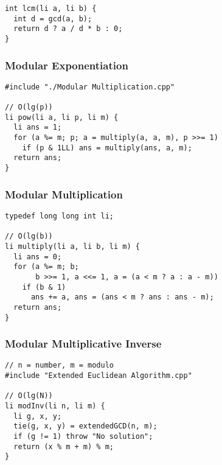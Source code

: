 \documentclass[twoside]{article}
\newcommand{\fileTitleStyle}{\large\underline}
\begin{document}
\begin{multicols*}{2}
\begin{verbatim}
int lcm(li a, li b) {
  int d = gcd(a, b);
  return d ? a / d * b : 0;
}
\end{verbatim}

\subsubsectionfont{\centering\bfseries\Large}
\subsubsectionfont{\fileTitleStyle}
\subsubsection*{Modular Exponentiation}
\begin{verbatim}
#include "./Modular Multiplication.cpp"

// O(lg(p))
li pow(li a, li p, li m) {
  li ans = 1;
  for (a %= m; p; a = multiply(a, a, m), p >>= 1)
    if (p & 1LL) ans = multiply(ans, a, m);
  return ans;
}
\end{verbatim}

\subsubsectionfont{\centering\bfseries\Large}
\subsubsectionfont{\fileTitleStyle}
\subsubsection*{Modular Multiplication}
\begin{verbatim}
typedef long long int li;

// O(lg(b))
li multiply(li a, li b, li m) {
  li ans = 0;
  for (a %= m; b;
       b >>= 1, a <<= 1, a = (a < m ? a : a - m))
    if (b & 1)
      ans += a, ans = (ans < m ? ans : ans - m);
  return ans;
}
\end{verbatim}

\subsubsectionfont{\centering\bfseries\Large}
\subsubsectionfont{\fileTitleStyle}
\subsubsection*{Modular Multiplicative Inverse}
\begin{verbatim}
// n = number, m = modulo
#include "Extended Euclidean Algorithm.cpp"

// O(lg(N))
li modInv(li n, li m) {
  li g, x, y;
  tie(g, x, y) = extendedGCD(n, m);
  if (g != 1) throw "No solution";
  return (x % m + m) % m;
}
\end{verbatim}

\subsubsectionfont{\centering\bfseries\Large}
\subsubsectionfont{\fileTitleStyle}

\end{multicols*}
\end{document}
